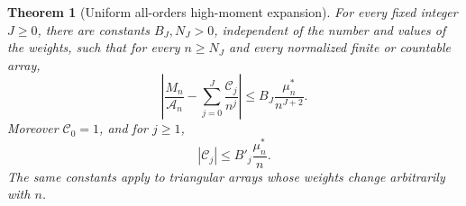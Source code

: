 \documentclass[11pt,a4paper]{article}
\numberwithin{equation}{section}
\newtheorem{theorem}{Theorem}[section]
\theoremstyle{definition}\newtheorem{definition}[theorem]{Definition}
\theoremstyle{remark}\newtheorem{remark}[theorem]{Remark}
\newcommand{\Cj}{\mathscr C}
\newcommand{\A}{\mathcal A}
\begin{document}
\begin{theorem}[Uniform all-orders high-moment expansion]\label{thm:main}
For every fixed integer $J\ge0$, there are constants $B_J,N_J>0$, independent of the number and values of the weights, such that for every $n\ge N_J$ and every normalized finite or countable array,
\begin{equation}\label{eq:main}
 \left|\frac{M_n}{\A_n}-\sum_{j=0}^{J}\frac{\Cj_j}{n^j}\right|
 \le B_J\frac{\mu_n^*}{n^{J+2}}.
\end{equation}
Moreover $\Cj_0=1$, and for $j\ge1$,
\begin{equation}\label{eq:sparsecoeff}
 |\Cj_j|\le B'_j\frac{\mu_n^*}{n}.
\end{equation}
The same constants apply to triangular arrays whose weights change arbitrarily with $n$.
\end{theorem}
\end{document}
